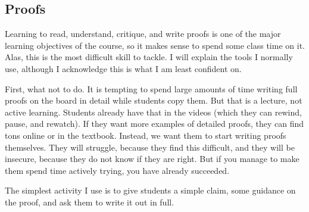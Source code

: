 \documentclass[11pt]{article}
\begin{document}
\newpage

\subsection{Proofs}

Learning to read, understand, critique, and write proofs is one of the major learning objectives of the course, so it makes sense to spend some class time on it.  Alas, this is the most difficult skill to tackle.  I will explain the tools I normally use, although I acknowledge this is what I am least confident on.

{\baselineskip
First, what not to do.  It is tempting to spend large amounts of time writing full proofs on the board in detail while students copy them.  But that is a lecture, not active learning.   Students already have that in the videos (which they can rewind, pause, and rewatch).  If they want more examples of detailed proofs, they can find tons online or in the textbook.  Instead, we want them to start writing proofs themselves.  They will struggle, because they find this difficult, and they will be insecure, because they do not know if they are right.   But if you manage to make them spend time actively trying, you have already succeeded.

The simplest activity I use is to give students a simple claim, some guidance on the proof, and ask them to write it out in full.\\
}
\end{document}
